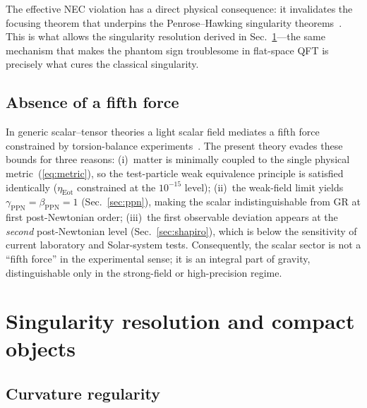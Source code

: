 \documentclass[aps,prd,onecolumn,superscriptaddress,nofootinbib,showpacs,12pt]{revtex4-2}
\begin{document}
The effective NEC violation has a direct physical
consequence:
it invalidates the focusing theorem that underpins the
Penrose--Hawking singularity
theorems~\cite{Penrose1965,Hawking1970}.  This is what
allows the singularity resolution derived in
Sec.~\ref{sec:singularity}---the same mechanism that
makes the phantom sign troublesome in flat-space QFT
is precisely what cures the classical singularity.

\subsection{Absence of a fifth force}\label{sec:fifth_force}

In generic scalar--tensor theories a light scalar field
mediates a fifth force constrained by torsion-balance
experiments~\cite{Adelberger2003}.
The present theory evades these bounds for three reasons:
(i)~matter is minimally coupled to the single physical
metric~(\ref{eq:metric}), so the test-particle weak
equivalence principle is satisfied identically
($\eta_{\mathrm{E\ddot{o}t}}$ constrained at the
$10^{-15}$ level);
(ii)~the weak-field limit yields
$\gamma_{\mathrm{PPN}} = \beta_{\mathrm{PPN}} = 1$
(Sec.~\ref{sec:ppn}), making the scalar indistinguishable
from GR at first post-Newtonian order;
(iii)~the first observable deviation appears at the
\emph{second} post-Newtonian level
(Sec.~\ref{sec:shapiro}), which is below the sensitivity
of current laboratory and Solar-system tests.
Consequently, the scalar sector is not a ``fifth force''
in the experimental sense; it is an integral part of
gravity, distinguishable only in the strong-field or
high-precision regime.

\section{Singularity resolution and compact objects}
\label{sec:singularity}

\subsection{Curvature regularity}\label{sec:curvature}
\end{document}
